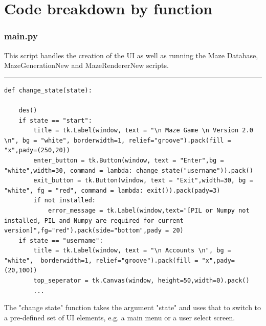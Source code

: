\documentclass{article}
\begin{document}
\clearpage
\part{Code breakdown by function}
\section{main.py}
This script handles the creation of the UI as well as running the Maze Database, MazeGenerationNew and 
MazeRendererNew scripts.

\textcolor[RGB]{220,220,220}{\rule{\linewidth}{0.2pt}}
\begin{lstlisting}
def change_state(state):      

    des()
    if state == "start":    
        title = tk.Label(window, text = "\n Maze Game \n Version 2.0 \n", bg = "white", borderwidth=1, relief="groove").pack(fill = "x",pady=(250,20))
        enter_button = tk.Button(window, text = "Enter",bg = "white",width=30, command = lambda: change_state("username")).pack()
        exit_button = tk.Button(window, text = "Exit",width=30, bg = "white", fg = "red", command = lambda: exit()).pack(pady=3)
        if not installed:
            error_message = tk.Label(window,text="[PIL or Numpy not installed, PIL and Numpy are required for current version]",fg="red").pack(side="bottom",pady = 20)
    if state == "username": 
        title = tk.Label(window, text = "\n Accounts \n", bg = "white",  borderwidth=1, relief="groove").pack(fill = "x",pady=(20,100))
        top_seperator = tk.Canvas(window, height=50,width=0).pack()
        ...
\end{lstlisting}
The "change state" function takes the argument "state" and uses that to switch to a pre-defined set of UI elements, e.g. a main menu or a user select screen.
\end{document}
